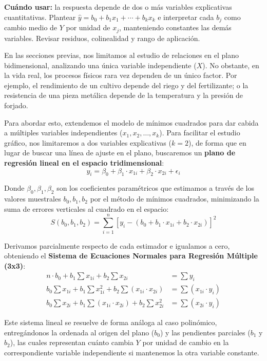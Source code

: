 \documentclass[11pt,a4paper]{article}
\begin{document}
\begin{ruta}
\textbf{Cuándo usar:} la respuesta depende de dos o más variables explicativas cuantitativas. Plantear $\hat y=b_0+b_1x_1+\cdots+b_kx_k$ e interpretar cada $b_j$ como cambio medio de $Y$ por unidad de $x_j$, manteniendo constantes las demás variables. Revisar residuos, colinealidad y rango de aplicación.
\end{ruta}

En las secciones previas, nos limitamos al estudio de relaciones en el plano bidimensional, analizando una única variable independiente ($X$). No obstante, en la vida real, los procesos físicos rara vez dependen de un único factor. Por ejemplo, el rendimiento de un cultivo depende del riego y del fertilizante; o la resistencia de una pieza metálica depende de la temperatura y la presión de forjado.

Para abordar esto, extendemos el modelo de mínimos cuadrados para dar cabida a múltiples variables independientes ($x_1, x_2, \dots, x_k$). Para facilitar el estudio gráfico, nos limitaremos a dos variables explicativas ($k = 2$), de forma que en lugar de buscar una línea de ajuste en el plano, buscaremos un \textbf{plano de regresión lineal en el espacio tridimensional}:
\begin{equation}
    y_i = \beta_0 + \beta_1 \cdot x_{1i} + \beta_2 \cdot x_{2i} + \epsilon_i
\end{equation}

Donde $\beta_0, \beta_1, \beta_2$ son los coeficientes paramétricos que estimamos a través de los valores muestrales $b_0, b_1, b_2$ por el método de mínimos cuadrados, minimizando la suma de errores verticales al cuadrado en el espacio:
\[ S(b_0, b_1, b_2) = \sum_{i=1}^n \left[ y_i - (b_0 + b_1 \cdot x_{1i} + b_2 \cdot x_{2i}) \right]^2 \]

Derivamos parcialmente respecto de cada estimador e igualamos a cero, obteniendo el \textbf{Sistema de Ecuaciones Normales para Regresión Múltiple (3x3)}:
\begin{align*}
    n \cdot b_0 + b_1 \sum x_{1i} + b_2 \sum x_{2i} &= \sum y_i \\
    b_0 \sum x_{1i} + b_1 \sum x_{1i}^2 + b_2 \sum (x_{1i} \cdot x_{2i}) &= \sum (x_{1i} \cdot y_i) \\
    b_0 \sum x_{2i} + b_1 \sum (x_{1i} \cdot x_{2i}) + b_2 \sum x_{2i}^2 &= \sum (x_{2i} \cdot y_i)
\end{align*}

Este sistema lineal se resuelve de forma análoga al caso polinómico, entregándonos la ordenada al origen del plano ($b_0$) y las pendientes parciales ($b_1$ y $b_2$), las cuales representan cuánto cambia $Y$ por unidad de cambio en la correspondiente variable independiente si mantenemos la otra variable constante.
\end{document}
